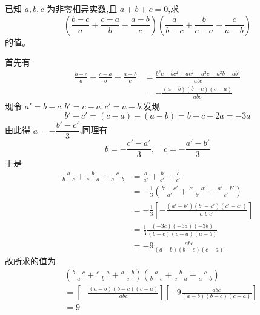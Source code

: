 \begin{questions}

    \question 已知 $a, b, c$ 为非零相异实数,且 $a + b + c = 0$,求
    \[ 
    \left(\frac{b - c}{a} + \frac{c - a}{b} + \frac{a - b}{c}\right) \left(\frac{a}{b - c} + \frac{b}{c - a} + \frac{c}{a - b}\right) 
    \]
    的值。
    \begin{solution}
        首先有
        \begin{align*}
        \frac{b - c}{a} + \frac{c - a}{b} + \frac{a - b}{c} &= \frac{b^2 c - b c^2 + a c^2 - a^2 c + a^2 b - a b^2}{abc} \\
        &= -\frac{(a - b)(b - c)(c - a)}{abc}
        \end{align*}
        现令 $a' = b - c,b' = c - a,c' = a - b$,发现
        \[ 
        b' - c' = (c - a) - (a - b) = b + c - 2a = -3a
        \]
        由此得 $a = -\dfrac{b' - c'}{3}$,同理有
        \[ 
        b = -\frac{c' - a'}{3}, \quad c = -\frac{a' - b'}{3} \]
        于是
        \begin{align*}
        \frac{a}{b - c} + \frac{b}{c - a} + \frac{c}{a - b} &= \frac{a}{a'} + \frac{b}{b'} + \frac{c}{c'} \\
        &= -\frac{1}{3} \left(\frac{b' - c'}{a'} + \frac{c' - a'}{b'} + \frac{a' - b'}{c'}\right) \\
        &= -\frac{1}{3} \left[ -\frac{(a' - b')(b' - c')(c' - a')}{a' b' c'} \right] \\
        &= \frac{1}{3} \frac{(-3c)(-3a)(-3b)}{(b - c)(c - a)(a - b)} \\
        &= -9 \frac{abc}{(a - b)(b - c)(c - a)}
        \end{align*}
        故所求的值为
        \begin{align*}
        &\left(\frac{b - c}{a} + \frac{c - a}{b} + \frac{a - b}{c}\right) \left(\frac{a}{b - c} + \frac{b}{c - a} + \frac{c}{a - b}\right) \\
        &=\left[ -\frac{(a - b)(b - c)(c - a)}{abc} \right] \left[ -9 \frac{abc}{(a - b)(b - c)(c - a)} \right] \\
        &= 9
        \end{align*}
    \end{solution}


\end{questions}
